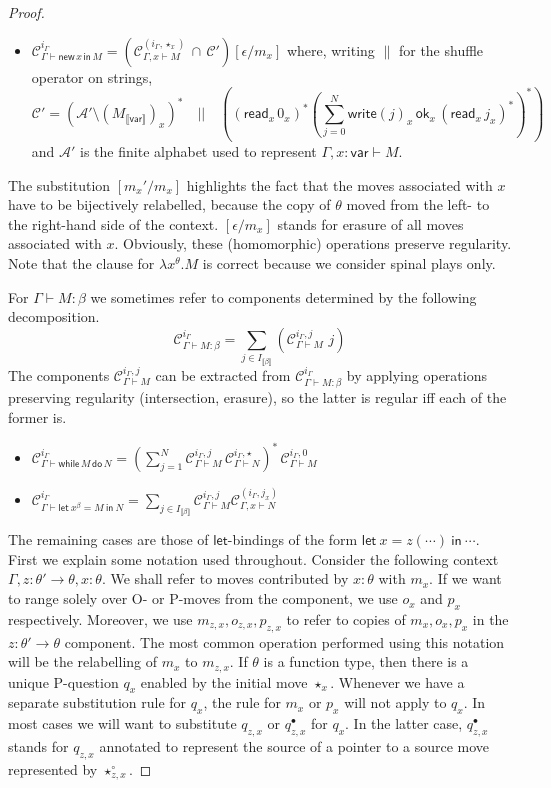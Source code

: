 \documentclass{CSML}
\theoremstyle{definition}\newtheorem{definition}[thm]{Definition}
\theoremstyle{definition}\newtheorem{example}[thm]{Example}
\theoremstyle{definition}\newtheorem{proposition}[thm]{Proposition}
\theoremstyle{definition}\newtheorem{lemma}[thm]{Lemma}
\theoremstyle{definition}\newtheorem{theorem}[thm]{Theorem}
\theoremstyle{definition}\newtheorem{corollary}[thm]{Corollary}
\theoremstyle{definition}\newtheorem{remark}[thm]{Remark}
\newcommand\nt[1]{#1}
\newcommand\clg[1]{\mathcal{#1}}
\newcommand\mwrite[1]{\mathsf{write}(#1)}
\newcommand\mread{\mathsf{read}}
\newcommand\mok{\mathsf{ok}}
\newcommand\compi[2]{\mathcal{C}_{#1}^{#2}}
\newcommand\letin[2]{\mathsf{let}\ #1\ \mathsf{in}\ #2}
\newcommand\vart{\mathsf{var}}
\newcommand\while[2]{\mathsf{while}\,#1\,\mathsf{do}\,#2}
\newcommand{\rarr}{\rightarrow}
\newcommand\sem[1]{\llbracket #1 \rrbracket}
\newcommand\seq[2]{{#1} \vdash {#2}}
\newcommand\new[2]{\mathsf{new}\,#1\,\mathsf{in}\,#2}
\begin{document}
\begin{proof}
\begin{itemize}
\item $\compi{\seq{\Gamma}{\new{x}{M}}}{i_\Gamma} = (\compi{\seq{\Gamma,x}{M}}{(i_\Gamma,\star_x)}\, \cap\, \clg{C}') [\epsilon/m_x]$ where, \nt{writing $\|$ for the shuffle operator on strings,} 
\[
\clg{C'}= (\clg{A}'\setminus (M_{\sem{\vart}})_x)^\ast\quad ||\quad ((\mread_x\,0_x)^\ast (\sum_{j=0}^N \mwrite{j}_x\,\mok_x\,(\mread_x\,j_x)^\ast  )^\ast)
\]
and $\clg{A}'$ is the finite alphabet used to represent $\seq{\Gamma,x:\vart}{M}$.
\end{itemize}
The substitution $[m_x'/m_x]$ highlights the fact that the moves associated with $x$ have to be bijectively relabelled, because
the copy of $\theta$ moved from the left- to the right-hand side of the context.
$[\epsilon/m_x]$ stands for erasure of all moves associated with $x$. Obviously, these (homomorphic) operations preserve regularity. 
Note that the clause for $\lambda x^\theta.M$ is correct because we consider spinal plays only.

For $\seq{\Gamma}{M:\beta}$ we sometimes refer
to components determined by the following decomposition.
\[
\compi{\seq{\Gamma}{M:\beta}}{i_\Gamma}=\sum_{j\in I_{\sem{\beta}}} (\compi{\seq{\Gamma}{M}}{i_\Gamma,j}\,\,j)
\]
The components $\compi{\seq{\Gamma}{M}}{i_\Gamma,j}$ can be extracted from $\compi{\seq{\Gamma}{M:\beta}}{i_\Gamma}$
by applying operations preserving regularity (intersection, erasure), so the latter is regular iff each of the former is.
\begin{itemize}
\item $\compi{\seq{\Gamma}{\while{M}{N}}}{i_\Gamma}= (\sum_{j=1}^N  \compi{\seq{\Gamma}{M}}{i_\Gamma,j} 
\,\compi{\seq{\Gamma}{N}}{i_\Gamma,\star}  )^\ast \,\compi{\seq{\Gamma}{M}}{i_\Gamma,0}$
\item $\compi{\seq{\Gamma}{\letin{x^\beta=M}{N}}}{i_\Gamma}=\sum_{j\in I_{\sem{\beta}}} \compi{\seq{\Gamma}{M}}{i_\Gamma,j}  
\compi{\seq{\Gamma,x}{N}}{(i_\Gamma,j_x)}$
\end{itemize}


The remaining cases are those of $\mathsf{let}$-bindings of the form $\letin{x=z(\cdots)}{\cdots}$.
First we explain some notation used throughout.
Consider the following context $\Gamma,z:\theta'\rarr\theta,x:\theta$.
We shall refer to moves contributed by $x:\theta$ with $m_x$.
If we want to range solely over O- or P-moves from the component, we use $o_x$ and $p_x$ respectively.
Moreover, we use $m_{z,x}, o_{z,x}, p_{z,x}$ to refer to copies of $m_x, o_x, p_x$ in the $z:\theta'\rarr\theta$ component.
The most common operation performed using this notation will be the relabelling of $m_x$ to $m_{z,x}$.
If $\theta$ is a function type, then there is a unique P-question $q_x$ enabled by the initial move $\star_x$.
Whenever we have a separate substitution rule for $q_x$, the rule for $m_x$ or $p_x$ will not apply to $q_x$.
In most cases we will want to substitute $q_{z,x}$ or $q_{z,x}^\bullet$ for $q_x$. In the latter case, $q_{z,x}^\bullet$ stands for $q_{z,x}$
annotated to represent the source of a pointer to a source move represented by $\star_{z,x}^\circ$.


\end{proof}
\end{document}
